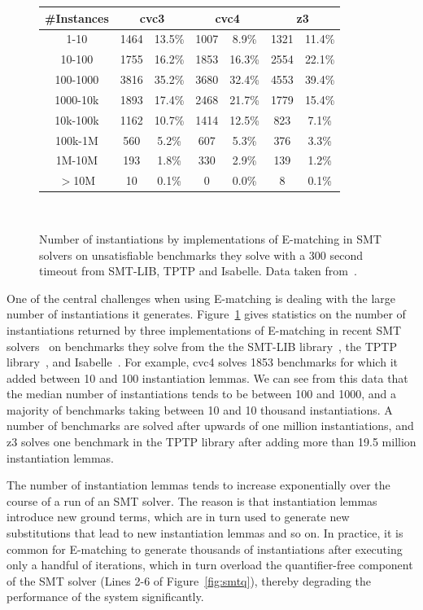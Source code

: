 \documentclass[oribibl]{llncs}
\begin{document}
\begin{figure}[t]
\centering
{
\begin{tabular}{|c|cc|cc|cc|}      
\hline                                                                      
\#Instances & \multicolumn{2}{c|}{{\bf cvc3}} & \multicolumn{2}{c|}{{\bf cvc4}} & \multicolumn{2}{c|}{{\bf z3}} \\
\hline   
1-10 & 1464 & 13.5\% & 1007 & 8.9\% & 1321 & 11.4\% \\
10-100 & 1755 & 16.2\% & 1853 & 16.3\% & 2554 & 22.1\% \\
100-1000 & 3816 & 35.2\% & 3680 & 32.4\% & 4553 & 39.4\% \\
1000-10k & 1893 & 17.4\% & 2468 & 21.7\% & 1779 & 15.4\% \\
10k-100k & 1162 & 10.7\% & 1414 & 12.5\% & 823 & 7.1\% \\
100k-1M & 560 & 5.2\% & 607 & 5.3\% & 376 & 3.3\% \\
1M-10M & 193 & 1.8\% & 330 & 2.9\% & 139 & 1.2\% \\
$>$10M & 10 & 0.1\% & 0 & 0.0\% & 8 & 0.1\%  \\                           
\hline                                                                
\end{tabular}
\\
}
\caption{Number of instantiations by implementations of E-matching in SMT solvers
on unsatisfiable benchmarks they solve with a 300 second timeout from SMT-LIB, TPTP and Isabelle. Data taken from~\cite{}.}
\label{fig:results-inst}
\end{figure}

One of the central challenges when using E-matching is dealing with the large number of instantiations it generates.
Figure~\ref{fig:results-inst} gives statistics on the number of instantiations returned by three implementations of E-matching in recent SMT solvers~\cite{}
on benchmarks they solve from the the SMT-LIB library~\cite{}, the TPTP library~\cite{}, and Isabelle~\cite{}.
For example, cvc4 solves 1853 benchmarks for which it added between 10 and 100 instantiation lemmas.
We can see from this data that the median number of instantiations tends to be between 100 and 1000,
and a majority of benchmarks taking between 10 and 10 thousand instantiations.
A number of benchmarks are solved after upwards of one million instantiations,
and z3 solves one benchmark in the TPTP library after adding more than 19.5 million instantiation lemmas.

The number of instantiation lemmas tends to increase exponentially over the course of a run of an SMT solver.
The reason is that instantiation lemmas introduce new ground terms, which are in turn used to generate new substitutions that lead to
new instantiation lemmas and so on.
In practice, it is common for E-matching to generate thousands of instantiations after executing only a handful of iterations,
which in turn overload the quantifier-free component of the SMT solver (Lines 2-6 of Figure~\ref{fig:smtq}),
thereby degrading the performance of the system significantly.
\end{document}
